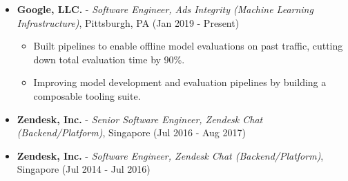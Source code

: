 \begin{itemize}
\tightlist
\item
  \textbf{Google, LLC.} - \emph{Software Engineer, Ads Integrity
  (Machine Learning Infrastructure)}, Pittsburgh, PA \hfill (Jan 2019 -
  Present)

  \begin{itemize}
  \tightlist
  \item
    Built pipelines to enable offline model evaluations on past traffic,
    cutting down total evaluation time by 90\%.
  \item
    Improving model development and evaluation pipelines by building a
    composable tooling suite.
  \end{itemize}
\item
  \textbf{Zendesk, Inc.} - \emph{Senior Software Engineer, Zendesk Chat
  (Backend/Platform)}, Singapore \hfill (Jul 2016 - Aug 2017)
\item
  \textbf{Zendesk, Inc.} - \emph{Software Engineer, Zendesk Chat
  (Backend/Platform)}, Singapore \hfill (Jul 2014 - Jul 2016)


\end{itemize}

